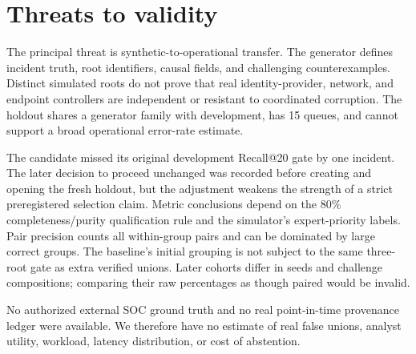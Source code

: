 \section{Threats to validity}
The principal threat is synthetic-to-operational transfer. The generator defines incident truth, root identifiers, causal fields, and challenging counterexamples. Distinct simulated roots do not prove that real identity-provider, network, and endpoint controllers are independent or resistant to coordinated corruption. The holdout shares a generator family with development, has 15 queues, and cannot support a broad operational error-rate estimate.

The candidate missed its original development Recall@20 gate by one incident. The later decision to proceed unchanged was recorded before creating and opening the fresh holdout, but the adjustment weakens the strength of a strict preregistered selection claim. Metric conclusions depend on the 80\% completeness/purity qualification rule and the simulator's expert-priority labels. Pair precision counts all within-group pairs and can be dominated by large correct groups. The baseline's initial grouping is not subject to the same three-root gate as extra verified unions. Later cohorts differ in seeds and challenge compositions; comparing their raw percentages as though paired would be invalid.

No authorized external SOC ground truth and no real point-in-time provenance ledger were available. We therefore have no estimate of real false unions, analyst utility, workload, latency distribution, or cost of abstention.
